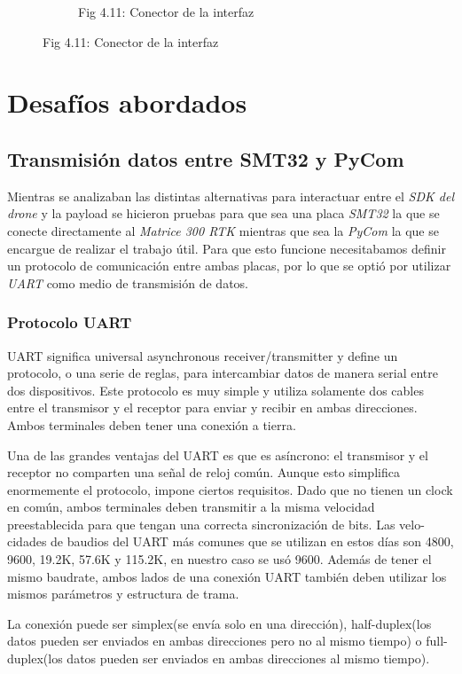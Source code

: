 \documentclass[12pt]{article}
\begin{document}
\begin{figure}[ht]
\begin{subfigure}[b]{0.45\linewidth}
    \caption{Fig 4.11: Conector de la interfaz}
  \end{subfigure}
\end{figure}

\vspace*{200pt}
\newpage
\section{Desafíos abordados}

\subsection{Transmisión datos entre SMT32 y PyCom}
Mientras se analizaban las distintas alternativas para interactuar entre el \textit{SDK del drone} y la payload se hicieron pruebas para que sea una placa \textit{SMT32} la que se conecte directamente al \textit{Matrice 300 RTK} mientras que sea la \textit{PyCom} la que se encargue de  realizar el trabajo útil. Para que esto funcione necesitabamos definir un protocolo de comunicación entre ambas placas, por lo que se optió por utilizar \textit{UART} como medio de transmisión de datos.

\subsubsection{Protocolo UART}
UART significa universal asynchronous receiver/transmitter y define un protocolo, o una serie de reglas, para intercambiar datos de manera serial entre dos dispositivos. Este protocolo es muy simple y utiliza solamente dos cables entre el transmisor y el receptor para enviar y recibir en ambas direcciones. Ambos terminales deben tener una conexión a tierra.

Una de las grandes ventajas del UART es que es asíncrono: el transmisor y el receptor no comparten una señal de reloj común. Aunque esto simplifica enormemente el protocolo, impone ciertos requisitos. Dado que no tienen un clock en común, ambos terminales deben transmitir a la misma velocidad preestablecida para que tengan una correcta sincronización de bits. Las velo-cidades de baudios del UART más comunes que se utilizan en estos días son 4800, 9600, 19.2K, 57.6K y 115.2K, en nuestro caso se usó 9600. Además de tener el mismo baudrate, ambos lados de una conexión UART también deben utilizar los mismos parámetros y estructura de trama. \cite{uart}

La conexión puede ser simplex(se envía solo en una dirección), half-duplex(los datos pueden ser enviados en ambas direcciones pero no al mismo tiempo) o full-duplex(los datos pueden ser enviados en ambas direcciones al mismo tiempo).
\end{document}
